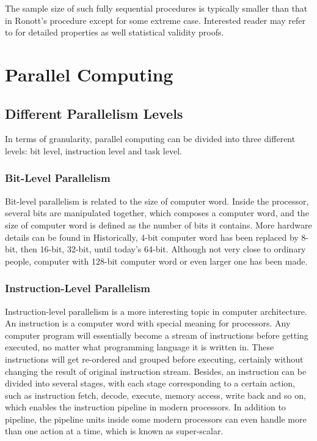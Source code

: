 \documentclass[12pt,a4paper]{report}
\begin{document}
The sample size of such fully sequential procedures is typically smaller than that in Ronott's procedure except for some extreme case. Interested reader may refer to \cite{ras-seq-jeff} for detailed properties as well statistical validity proofs.

\section{Parallel Computing}

\subsection{Different Parallelism Levels}

In terms of granularity, parallel computing can be divided into three different levels: bit level, instruction level and task level.

\subsubsection{Bit-Level Parallelism}

Bit-level parallelism is related to the size of computer word. Inside the processor, several bits are manipulated together, which composes a computer word, and the size of computer word is defined as the number of bits it contains. More hardware details can be found in \cite{pca97} Historically, 4-bit computer word has been replaced by 8-bit, then 16-bit, 32-bit, until today's 64-bit. Although not very close to ordinary people, computer with 128-bit computer word or even larger one has been made.

\subsubsection{Instruction-Level Parallelism}

Instruction-level parallelism is a more interesting topic in computer architecture. An instruction is a computer word with special meaning for processors. Any computer program will essentially become a stream of instructions before getting executed, no matter what programming language it is written in. These instructions will get re-ordered and grouped before executing, certainly without changing the result of original instruction stream. Besides, an instruction can be divided into several stages, with each stage corresponding to a certain action, such as instruction fetch, decode, execute, memory access, write back and so on, which enables the instruction pipeline in modern processors. In addition to pipeline, the pipeline units inside some modern processors can even handle more than one action at a time, which is known as super-scalar.
\end{document}

